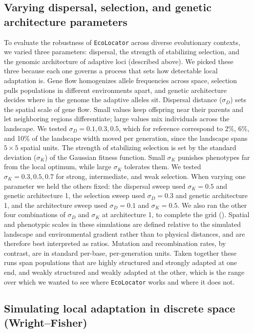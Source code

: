 \documentclass[]{article}
\newcommand{\ecolocator}{\texttt{EcoLocator}\xspace}
\begin{document}
\subsection{Varying dispersal, selection, and genetic architecture parameters}
To evaluate the robustness of \ecolocator
across diverse evolutionary contexts,
we varied three parameters: dispersal,
the strength of stabilizing selection,
and the genomic architecture of adaptive loci (described above).
We picked these three because each one governs
a process that sets how detectable local adaptation is.
Gene flow homogenizes allele frequencies across space,
selection pulls populations in different environments apart,
and genetic architecture decides where in the genome
the adaptive alleles sit.
Dispersal distance (\(\sigma_D\)) sets the spatial scale
of gene flow. Small values keep offspring near their parents
and let neighboring regions differentiate;
large values mix individuals across the landscape.
We tested \(\sigma_D = 0.1, 0.3, 0.5\), which for reference correspond to 2\%, 6\%, and 10\% of the landscape width moved per generation, since the landscape spans $5 \times 5$ spatial units.
The strength of stabilizing selection is set
by the standard deviation (\(\sigma_K\))
of the Gaussian fitness function.
Small \(\sigma_K\) punishes phenotypes far from the local optimum,
while large \(\sigma_K\) tolerates them.
We tested \(\sigma_K = 0.3, 0.5, 0.7\)
for strong, intermediate, and weak selection.
When varying one parameter we held the others fixed:
the dispersal sweep used \(\sigma_K = 0.5\) and genetic architecture 1,
the selection sweep used \(\sigma_D = 0.3\) and genetic architecture 1,
and the architecture sweep used \(\sigma_D = 0.1\) and \(\sigma_K = 0.5\).
We also ran the other four combinations of \(\sigma_D\) and \(\sigma_K\)
at architecture 1, to complete the grid ().
Spatial and phenotypic scales in these simulations are defined relative to the 
simulated landscape and environmental gradient rather than to physical distances,
and are therefore best interpreted as ratios.
Mutation and recombination rates, by contrast, are in standard per-base, per-generation units.
Taken together these runs span populations that are highly structured
and strongly adapted at one end,
and weakly structured and weakly adapted at the other,
which is the range over which we wanted to see
where \ecolocator works and where it does not.

\subsection{Simulating local adaptation in discrete space (Wright--Fisher)}
\end{document}
